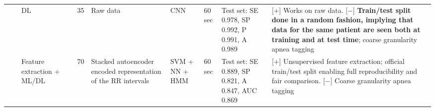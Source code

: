 \documentclass[5p,twocolumn,lefttitle]{elsarticle}
\begin{document}
\begin{table*}[!ht]
{\begin{tabularx}{2\textwidth}{@{}m{2.5em}p{7em}p{10em}lp{2em}p{12em}p{7em}p{3em}p{17em}X@{}}
                            &                                                         & DL                                                             & \cite{dey2018obstructive}                & 35            & Raw data                                                                                                          & CNN                                 & 60 sec                                     & Test set: SE 0.978, SP 0.992, P 0.991, A 0.989                                                                                                                                       & [+] Works on raw data. [$-$] \textbf{Train/test split done in a random fashion, implying that data for the same patient are seen both at training and at test time}; coarse granularity apnea tagging                                                                                                                                                                                                                               \\
                            \cmidrule(l){3-10} 
                            &                                                         & Feature extraction + ML/DL                                     & \cite{li2018method}                      & 70            & Stacked autoencoder encoded representation of the RR intervals                                                    & SVM + NN + HMM                      & 60 sec                                     & Test set: SE 0.889, SP 0.821, A 0.847, AUC 0.869                                                                                                                                        & [+] Unsupervised feature extraction; official train/test split enabling full reproducibility and fair comparison. [$-$] Coarse granularity apnea tagging                                                                                                                                                                                                                                                                 \\
                            \cmidrule(l){3-10} 

\end{tabularx}}
\end{table*}
\end{document}
